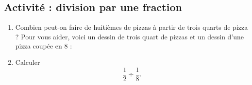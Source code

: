 
\subsection*{Activité : division par une fraction}

\begin{enumerate}
    \item
        Combien peut-on faire de huitièmes de pizzas à partir de trois quarts de pizza ? Pour vous aider, voici un dessin de trois quart de pizzas et un dessin d'une pizza coupée en \( 8\) :
        \begin{center}
           
           
        \end{center}
    \item
        Calculer
        \begin{equation}
            \dfrac{ 1 }{ 2 }\div\frac{1}{ 8 }.
        \end{equation}
\end{enumerate}
